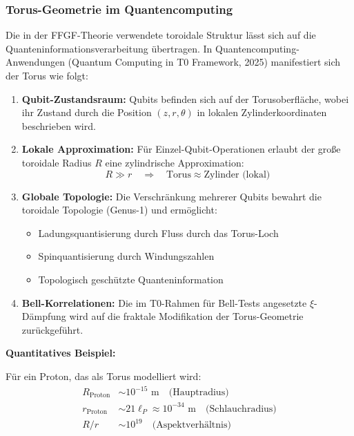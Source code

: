	\subsubsection{Torus-Geometrie im Quantencomputing}
	
	Die in der FFGF-Theorie verwendete toroidale Struktur lässt sich auf die Quanteninformationsverarbeitung übertragen. In Quantencomputing-Anwendungen (Quantum Computing in T0 Framework, 2025) manifestiert sich der Torus wie folgt:
	
	\begin{enumerate}
		\item \textbf{Qubit-Zustandsraum:} Qubits befinden sich auf der Torusoberfläche, wobei ihr Zustand durch die Position $(z, r, \theta)$ in lokalen Zylinderkoordinaten beschrieben wird.
		
		\item \textbf{Lokale Approximation:} Für Einzel-Qubit-Operationen erlaubt der große toroidale Radius $R$ eine zylindrische Approximation:
		\[
		R \gg r \quad \Rightarrow \quad 
		\text{Torus} \approx \text{Zylinder (lokal)}
		\]
		
		\item \textbf{Globale Topologie:} Die Verschränkung mehrerer Qubits bewahrt die toroidale Topologie (Genus-1) und ermöglicht:
		\begin{itemize}
			\item Ladungsquantisierung durch Fluss durch das Torus-Loch
			\item Spinquantisierung durch Windungszahlen
			\item Topologisch geschützte Quanteninformation
		\end{itemize}
		
		\item \textbf{Bell-Korrelationen:} Die im T0-Rahmen für Bell-Tests angesetzte $\xi$-Dämpfung wird auf die fraktale Modifikation der Torus-Geometrie zurückgeführt.
	\end{enumerate}
	
	\textbf{Quantitatives Beispiel:}
	
	Für ein Proton, das als Torus modelliert wird:
	\begin{align}
		R_{\text{Proton}} &\sim 10^{-15} \text{ m} \quad \text{(Hauptradius)} \\
		r_{\text{Proton}} &\sim 21\ell_P \approx 10^{-34} \text{ m} \quad 
		\text{(Schlauchradius)} \\
		R/r &\sim 10^{19} \quad \text{(Aspektverhältnis)}
	\end{align}
	
